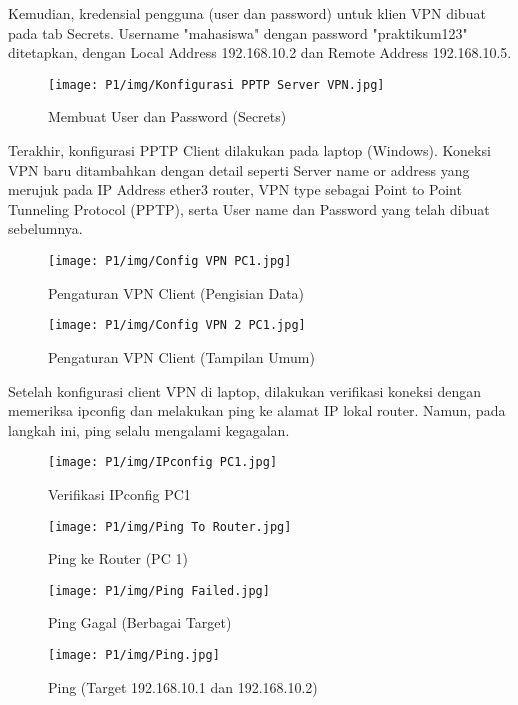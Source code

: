 Kemudian, kredensial pengguna (user dan password) untuk klien VPN dibuat pada tab Secrets. Username "mahasiswa" dengan password "praktikum123" ditetapkan, dengan Local Address 192.168.10.2 dan Remote Address 192.168.10.5.

\begin{figure}[H]
\centering
\begin{minipage}[b]{0.45\textwidth}
\texttt{[image: P1/img/Konfigurasi PPTP Server VPN.jpg]}
\caption{Membuat User dan Password (Secrets)}
\label{fig:pptp_secrets}
\end{minipage}
\end{figure}

Terakhir, konfigurasi PPTP Client dilakukan pada laptop (Windows). Koneksi VPN baru ditambahkan dengan detail seperti Server name or address yang merujuk pada IP Address ether3 router, VPN type sebagai Point to Point Tunneling Protocol (PPTP), serta User name dan Password yang telah dibuat sebelumnya.

\begin{figure}[H]
\centering
\begin{minipage}[b]{0.45\textwidth}
\texttt{[image: P1/img/Config VPN PC1.jpg]}
\caption{Pengaturan VPN Client (Pengisian Data)}
\label{fig:vpn_client_config}
\end{minipage}
\begin{minipage}[b]{0.45\textwidth}
\texttt{[image: P1/img/Config VPN 2 PC1.jpg]}
\caption{Pengaturan VPN Client (Tampilan Umum)}
\label{fig:vpn_client_overview}
\end{minipage}
\end{figure}

Setelah konfigurasi client VPN di laptop, dilakukan verifikasi koneksi dengan memeriksa ipconfig dan melakukan ping ke alamat IP lokal router. Namun, pada langkah ini, ping selalu mengalami kegagalan.

\begin{figure}[H]
\centering
\begin{minipage}[b]{0.45\textwidth}
\texttt{[image: P1/img/IPconfig PC1.jpg]}
\caption{Verifikasi IPconfig PC1}
\label{fig:ipconfig_pc1}
\end{minipage}
\begin{minipage}[b]{0.45\textwidth}
\texttt{[image: P1/img/Ping To Router.jpg]}
\caption{Ping ke Router (PC 1)}
\label{fig:ping_to_router}
\end{minipage}
\begin{minipage}[b]{0.45\textwidth}
\texttt{[image: P1/img/Ping Failed.jpg]}
\caption{Ping Gagal (Berbagai Target)}
\label{fig:ping_failed}
\end{minipage}
\begin{minipage}[b]{0.45\textwidth}
\texttt{[image: P1/img/Ping.jpg]}
\caption{Ping (Target 192.168.10.1 dan 192.168.10.2)}
\label{fig:ping_success_failure}
\end{minipage}
\end{figure}

